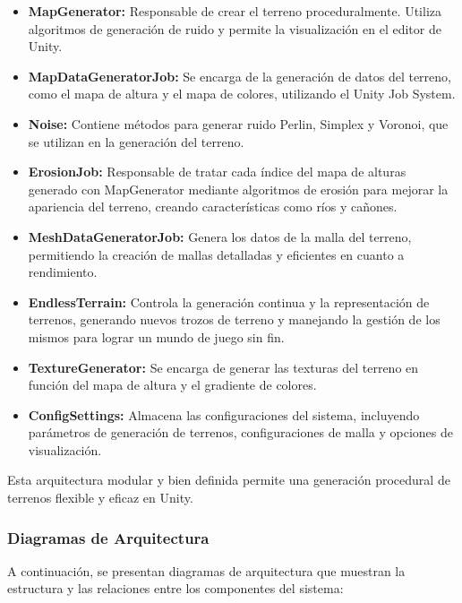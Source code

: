 \begin{itemize}
    \item \textbf{MapGenerator:} Responsable de crear el terreno proceduralmente. Utiliza algoritmos de generación de ruido y permite la visualización en el editor de Unity.
     
    \item \textbf{MapDataGeneratorJob:} Se encarga de la generación de datos del terreno, como el mapa de altura y el mapa de colores, utilizando el Unity Job System.

    \item \textbf{Noise:} Contiene métodos para generar ruido Perlin, Simplex y Voronoi, que se utilizan en la generación del terreno.
            
    \item \textbf{ErosionJob:} Responsable de tratar cada índice del mapa de alturas generado con MapGenerator mediante  algoritmos de erosión para mejorar la apariencia del terreno, creando características como ríos y cañones.
    
    \item \textbf{MeshDataGeneratorJob:} Genera los datos de la malla del terreno, permitiendo la creación de mallas detalladas y eficientes en cuanto a rendimiento.
    
    \item \textbf{EndlessTerrain:} Controla la generación continua y la representación de terrenos, generando nuevos trozos de terreno y manejando la gestión de los mismos para lograr un mundo de juego sin fin.
    
    \item \textbf{TextureGenerator:} Se encarga de generar las texturas del terreno en función del mapa de altura y el gradiente de colores.

    \item \textbf{ConfigSettings:} Almacena las configuraciones del sistema, incluyendo parámetros de generación de terrenos, configuraciones de malla y opciones de visualización.
\end{itemize}

Esta arquitectura modular y bien definida permite una generación procedural de terrenos flexible y eficaz en Unity.

\subsubsection{Diagramas de Arquitectura}
A continuación, se presentan diagramas de arquitectura que muestran la estructura y las relaciones entre los componentes del sistema:

